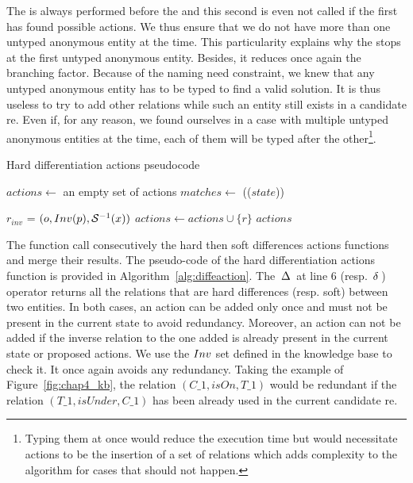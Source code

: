 The \typingactions{} is always performed before the \differenceactions{} and this second is even not called if the first has found possible actions. We thus ensure that we do not have more than one untyped anonymous entity at the time. This particularity explains why the \typingactions{} stops at the first untyped anonymous entity. Besides, it reduces once again the branching factor. Because of the naming need constraint, we knew that any untyped anonymous entity has to be typed to find a valid solution. It is thus useless to try to add other relations while such an entity still exists in a candidate \acrshort{re}. Even if, for any reason, we found ourselves in a case with multiple untyped anonymous entities at the time, each of them will be typed after the other\footnote{Typing them at once would reduce the execution time but would necessitate actions to be the insertion of a set of relations which adds complexity to the algorithm for cases that should not happen.}.

\begin{algorithm}[ht!]
\caption{\label{alg:diffeaction} Hard differentiation actions pseudocode}
\begin{algorithmic}[1]
    \State $actions\leftarrow$ an empty set of actions
    \State $matches\leftarrow$ \sparqlresult(\toquery($state$))

                \State $r_{inv}$ = $(o, Inv(p), \mathcal{S}^{-1}(x))$
                    \State $\textit{actions} \gets \textit{actions} \cup \{r\}$
                \EndIf
            \EndFor
        \EndIf
    \EndFor
    \Return $actions$
\EndFunction
\end{algorithmic}
\end{algorithm}

The \differenceactions{} function call consecutively the hard then soft differences actions functions and merge their results. The pseudo-code of the hard differentiation actions function is provided in Algorithm~\ref{alg:diffeaction}. The $\,\Delta\,$ at line 6 (resp. $\,\delta\,$) operator returns all the relations that are hard differences (resp. soft) between two entities. In both cases, an action can be added only once and must not be present in the current state to avoid redundancy. Moreover, an action can not be added if the inverse relation to the one added is already present in the current state or proposed actions. We use the $Inv$ set defined in the knowledge base to check it. It once again avoids any redundancy. Taking the example of Figure~\ref{fig:chap4_kb}, the relation $(C\_1, isOn, T\_1)$ would be redundant if the relation $(T\_1, isUnder, C\_1)$ has been already used in the current candidate \acrshort{re}.

